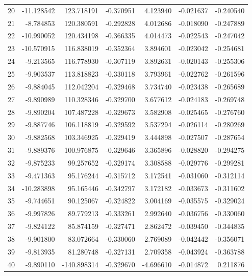 \begin{tabular}{rrrrrrr}
 20 & -11.128542 &  123.718191 & -0.370951 &    4.123940 &   -0.021637 & -0.240540 \\
 21 &  -8.784853 &  120.380591 & -0.292828 &    4.012686 &   -0.018090 & -0.247889 \\
 22 & -10.990052 &  120.434198 & -0.366335 &    4.014473 &   -0.022543 & -0.247042 \\
 23 & -10.570915 &  116.838019 & -0.352364 &    3.894601 &   -0.023042 & -0.254681 \\
 24 &  -9.213565 &  116.778930 & -0.307119 &    3.892631 &   -0.020143 & -0.255306 \\
 25 &  -9.903537 &  113.818823 & -0.330118 &    3.793961 &   -0.022762 & -0.261596 \\
 26 &  -9.884045 &  112.042204 & -0.329468 &    3.734740 &   -0.023438 & -0.265689 \\
 27 &  -9.890989 &  110.328346 & -0.329700 &    3.677612 &   -0.024183 & -0.269748 \\
 28 &  -9.890204 &  107.487228 & -0.329673 &    3.582908 &   -0.025465 & -0.276760 \\
 29 &  -9.887746 &  106.118819 & -0.329592 &    3.537294 &   -0.026114 & -0.280269 \\
 30 &  -9.882568 &  103.346925 & -0.329419 &    3.444898 &   -0.027507 & -0.287654 \\
 31 &  -9.889376 &  100.976875 & -0.329646 &    3.365896 &   -0.028820 & -0.294275 \\
 32 &  -9.875233 &   99.257652 & -0.329174 &    3.308588 &   -0.029776 & -0.299281 \\
 33 &  -9.471363 &   95.176244 & -0.315712 &    3.172541 &   -0.031060 & -0.312114 \\
 34 & -10.283898 &   95.165446 & -0.342797 &    3.172182 &   -0.033673 & -0.311602 \\
 35 &  -9.744651 &   90.125067 & -0.324822 &    3.004169 &   -0.035575 & -0.329024 \\
 36 &  -9.997826 &   89.779213 & -0.333261 &    2.992640 &   -0.036756 & -0.330060 \\
 37 &  -9.824122 &   85.874159 & -0.327471 &    2.862472 &   -0.039450 & -0.344835 \\
 38 &  -9.901800 &   83.072664 & -0.330060 &    2.769089 &   -0.042442 & -0.356071 \\
 39 &  -9.813935 &   81.280748 & -0.327131 &    2.709358 &   -0.043924 & -0.363788 \\
 40 &  -9.890110 & -140.898314 & -0.329670 &   -4.696610 &   -0.014872 &  0.211876 \\

\end{tabular}
